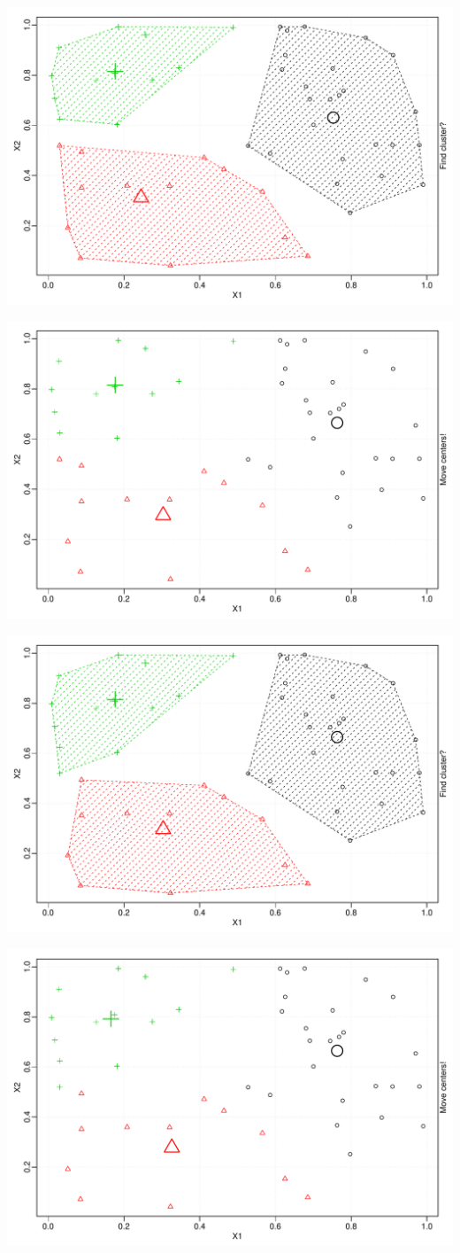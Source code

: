 \documentclass{beamer}\usepackage[]{graphicx}\usepackage[]{color}
\newenvironment{knitrout}{}{} %
\begin{document}
\begin{frame}
\begin{knitrout}
\includegraphics[width=.8\textwidth]{figures/unnamed-chunk-1-12} 

\includegraphics[width=.8\textwidth]{figures/unnamed-chunk-1-13} 

\includegraphics[width=.8\textwidth]{figures/unnamed-chunk-1-14} 

\includegraphics[width=.8\textwidth]{figures/unnamed-chunk-1-15} 


\end{knitrout}
\end{frame}
\end{document}
